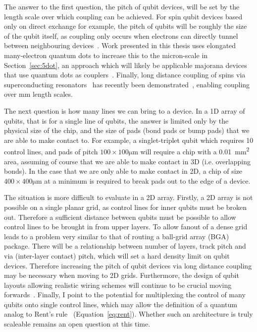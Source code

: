 The answer to the first question, the pitch of qubit devices, will be set by the length scale over which coupling can be achieved. For spin qubit devices based only
on direct exchange for example, the pitch of qubits will be roughly the size of the qubit itself, as coupling only occurs when electrons can directly tunnel between
neighbouring devices~\cite{PhysRevB.86.085423}. Work presented in this thesis uses elongated many-electron quantum dots to increase this to the micron-scale in
Section~\ref{sec:5dot}, an approach which will likely be applicable majorana devices that use quantum dots as couplers~\cite{PhysRevB.95.235305}. Finally, long
distance coupling of spins via superconducting resonators~\cite{PhysRevB.97.235409} has recently been demonstrated~\cite{2019arXiv190500776B}, enabling coupling
over \si{\milli\meter} length scales.

The next question is how many lines we can bring to a device. In a 1D array of qubits, that is for a single line of qubits, the answer is limited only by the
physical size of the chip, and the size of pads (bond pads or bump pads) that we are able to make contact to. For example, a singlet-triplet qubit which requires
10 control lines, and pads of pitch $100\times100\si{\micro\meter}$ will require a chip with a \SI{0.01}{\square\milli\meter} area, assuming of course that we are
able to make contact in 3D (i.e. overlapping bonds). In the case that we are only able to make contact in 2D, a chip of size $400\times400\si{\micro\meter}$ at a
minimum is required to break pads out to the edge of a device.

The situation is more difficult to evaluate in a 2D array. Firstly, a 2D array is not possible on
a single planar grid, as control lines for inner qubits must be broken out. Therefore a sufficient distance between qubits must be possible to allow control lines
to be brought in from upper layers. To allow fanout of a dense grid leads to a problem very similar to that of routing a ball-grid array (BGA) package. There will
be a relationship between number of layers, track pitch and via (inter-layer contact) pitch, which will set a hard density limit on qubit devices. Therefore
increasing the pitch of qubit devices via long distance coupling may be necessary when moving to 2D grids. Furthermore, the design of qubit layouts allowing
realistic wiring schemes will continue to be crucial moving forwards~\cite{10.1038/s41534-018-0074-2}. Finally, I point to the potential for multiplexing the
control of many qubits onto single control lines, which may allow the definition of a quantum analog to Rent's rule~\cite{FRANKE20191} (Equation~\ref{eq:rent}).
Whether such an architecture is truly scaleable remains an open question at this time.

